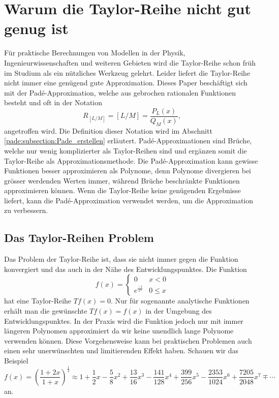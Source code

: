 %
%
%
\section{Warum die Taylor-Reihe nicht gut genug ist\label{pade:section:einleitung}}
Für praktische Berechnungen von Modellen in der Physik, Ingenieurwissenschaften und weiteren Gebieten wird die Taylor-Reihe schon früh im Studium als ein nützliches Werkzeug gelehrt.
Leider liefert die Taylor-Reihe nicht immer eine genügend gute Approximation.
Dieses Paper beschäftigt sich mit der Padé-Approximation, welche aus gebrochen rationalen Funktionen besteht und oft in der Notation
\begin{equation*}
R_{[L/M]}
=
[L/M]
=
\frac{P_{L}(x)}{Q_{M}(x)},
\end{equation*}
angetroffen wird. 
Die Definition dieser Notation wird im Abschnitt \ref{pade:subsection:Pade_erstellen} erläutert.
Padé-Approximationen sind Brüche, welche nur wenig komplizierter als Taylor-Reihen sind und ergänzen somit die Taylor-Reihe als Approximationsmethode.
Die Padé-Approximation kann gewisse Funktionen besser approximieren als Polynome, denn Polynome divergieren bei grösser werdenden Werten immer, während Brüche beschränkte Funktionen approximieren können.
Wenn die Taylor-Reihe keine genügenden Ergebnisse liefert, kann die Padé-Approximation verwendet werden, um die Approximation zu verbessern.

 

\subsection{Das Taylor-Reihen Problem
\label{pade:Taylorfehler}}

Das Problem der Taylor-Reihe ist, dass sie nicht immer gegen die Funktion konvergiert und das auch in der Nähe des Entwicklungspunktes.
Die Funktion 
\begin{equation}
f(x)
=
\left\{\begin{array}{cc}
0 & x<0  \\
e^{\frac{-1}{x^2}} & 0 \leq x
\end{array}\right.\end{equation}
hat eine Taylor-Reihe $Tf(x)=0$.
Nur für sogenannte analytische Funktionen erhält man die gewünschte $Tf(x)=f(x)$ in der Umgebung des Entwicklungspunktes. 
In der Praxis wird die Funktion jedoch nur mit immer längeren Polynomen approximiert da wir keine unendlich lange Polynome verwenden können.
Diese Vorgehensweise kann bei praktischen Problemen auch einen sehr unerwünschten und limitierenden Effekt haben. 
Schauen wir das Beispiel 
\begin{equation*}
f(x)
=
\left(\frac{1+2x}{1+x}\right)^{\frac{1}{2}}
\approx
1+\frac{1}{2}x - \frac{5}{8}x^2+\frac{13}{16}x^3 -\frac{141}{128}x^4 +\frac{399}{256}x^5 - \frac{2353}{1024}x^6 + \frac{7205}{2048}x^7 \mp \cdots
\end{equation*}
an. 

